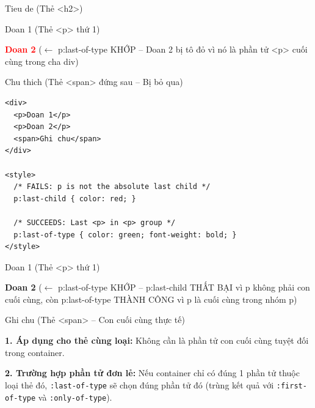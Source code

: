 \documentclass[11pt,oneside]{book}
\newcommand{\codeinline}[1]{\textcolor{accentOrange}{\texttt{#1}}}
\begin{document}
\begin{browserWindow}
\sffamily\small
Tieu de {\scriptsize\textcolor{gray!60}{(Thẻ <h2>)}} \par\vspace{2pt}
Doan 1 {\scriptsize\textcolor{gray!60}{(Thẻ <p> thứ 1)}} \par\vspace{2pt}
\textcolor{red}{\textbf{Doan 2}} {\scriptsize\textcolor{gray!60}{($\leftarrow$ p:last-of-type KHỚP -- Doan 2 bị tô đỏ vì nó là phần tử <p> cuối cùng trong cha div)}} \par\vspace{2pt}
Chu thich {\scriptsize\textcolor{gray!60}{(Thẻ <span> đứng sau -- Bị bỏ qua)}}
\end{browserWindow}

\begin{codeWindow}
\begin{lstlisting}[language=HTML5]
<div>
  <p>Doan 1</p>
  <p>Doan 2</p>
  <span>Ghi chu</span>
</div>

<style>
  /* FAILS: p is not the absolute last child */
  p:last-child { color: red; }

  /* SUCCEEDS: Last <p> in <p> group */
  p:last-of-type { color: green; font-weight: bold; }
</style>
\end{lstlisting}
\end{codeWindow}

\begin{browserWindow}
\sffamily\small
Doan 1 {\scriptsize\textcolor{gray!60}{(Thẻ <p> thứ 1)}} \par\vspace{2pt}
\textcolor{green!70!black}{\textbf{Doan 2}} {\scriptsize\textcolor{gray!60}{($\leftarrow$ p:last-of-type KHỚP -- p:last-child THẤT BẠI vì p không phải con cuối cùng, còn p:last-of-type THÀNH CÔNG vì p là cuối cùng trong nhóm p)}} \par\vspace{2pt}
Ghi chu {\scriptsize\textcolor{gray!60}{(Thẻ <span> -- Con cuối cùng thực tế)}}
\end{browserWindow}

\begin{warnBox}
\textbf{1. Áp dụng cho thẻ cùng loại:} Không cần là phần tử con cuối cùng tuyệt đối trong container.
\par\vspace{4pt}
\textbf{2. Trường hợp phần tử đơn lẻ:} Nếu container chỉ có đúng 1 phần tử thuộc loại thẻ đó, \codeinline{:last-of-type} sẽ chọn đúng phần tử đó (trùng kết quả với \codeinline{:first-of-type} và \codeinline{:only-of-type}).
\end{warnBox}
\end{document}
